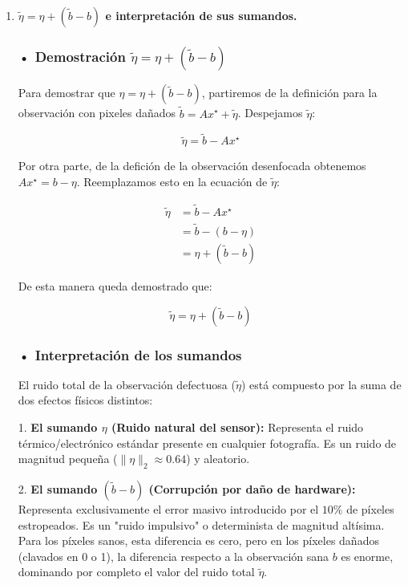 \documentclass{article}
\begin{document}
\begin{enumerate}[label=\roman*., widest=iii]
  \item \textbf{$\tilde{\eta} = \eta + (\tilde{b} - b)$ e interpretación de sus sumandos.}

  \subsubsection*{• Demostración $\tilde{\eta} = \eta + (\tilde{b} - b)$}

  Para demostrar que \(\eta=\eta+(\tilde b-b)\), partiremos de la definición para la observación con pixeles dañados \(\tilde b=Ax^\star+\tilde{\eta}\). Despejamos \(\tilde{\eta}\):

  \[
  \tilde{\eta}=\tilde b-Ax^\star
  \]

  Por otra parte, de la defición de la observación desenfocada obtenemos \(Ax^\star=b-\eta\). Reemplazamos esto en la ecuación de \(\tilde{\eta}\):

  \[
  \begin{aligned}
  \tilde{\eta}
  &=\tilde b-Ax^\star\\
  &=\tilde b-(b-\eta)\\
  &=\eta+(\tilde b-b)
  \end{aligned}
  \]

  De esta manera queda demostrado que:

  \[
  \boxed{\tilde{\eta}=\eta+(\tilde b-b)}
  \]

  \subsubsection*{• Interpretación de los sumandos}

  El ruido total de la observación defectuosa ($\tilde{\eta}$) está compuesto por la suma de dos efectos físicos distintos:

  1. \textbf{El sumando $\eta$ (Ruido natural del sensor):} Representa el ruido térmico/electrónico estándar presente en cualquier fotografía. Es un ruido de magnitud pequeña ($\|\eta\|_2 \approx 0.64$) y aleatorio.
  
  2. \textbf{El sumando $(\tilde{b} - b)$ (Corrupción por daño de hardware):} Representa exclusivamente el error masivo introducido por el $10\%$ de píxeles estropeados. Es un "ruido impulsivo" o determinista de magnitud altísima. Para los píxeles sanos, esta diferencia es cero, pero en los píxeles dañados (clavados en 0 o 1), la diferencia respecto a la observación sana $b$ es enorme, dominando por completo el valor del ruido total $\tilde{\eta}$. \\ 


\end{enumerate}
\end{document}

